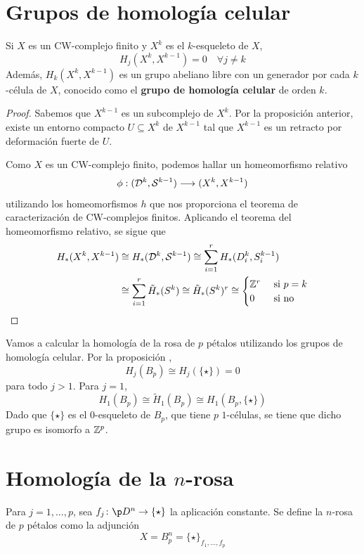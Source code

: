 \section{Grupos de homología celular}
\begin{corollary}\label{HomoCelular}
Si $X$ es un CW-complejo finito y $X^k$ es el $k$-esqueleto de $X$,
\[H_j(X^k,X^{k-1})=0 \quad \forall j \neq k\]
Además, $H_k(X^k,X^{k-1})$ es un grupo abeliano libre con un generador por
cada $k$-célula de $X$, conocido como el \textbf{grupo de homología celular}
de orden $k$.
\end{corollary}

\begin{proof}
Sabemos que $X^{k-1}$ es un subcomplejo de $X^k$. Por la proposición anterior,
existe un entorno compacto $U \subseteq X^k$ de $X^{k-1}$ tal que $X^{k-1}$
es un retracto por deformación fuerte de $U$.

Como $X$ es un CW-complejo finito, podemos hallar un homeomorfismo relativo
\[\phi: (\mathcal{D}^k, \mathcal{S}^{k-1}) \longrightarrow (X^k,X^{k-1})\]
utilizando los homeomorfismos $h$ que nos proporciona el teorema de
caracterización de CW-complejos finitos. Aplicando el teorema del
homeomorfismo relativo, se sigue que 
\begin{align*}
H_*(X^k,X^{k-1}) &\cong H_*(\mathcal{D}^k,\mathcal{S}^{k-1}) \cong 
	\sum^r_{i=1} H_*(D_i^k, S_i^{k-1}) \\
	& \cong \sum^r_{i=1} \tilde{H}_*(S^k) \cong
	\tilde{H}_*(S^k)^r \cong
	\begin{cases}
	\mathbb{Z}^r&\text{ si }p=k\\
	0&\text{ si no}
	\end{cases}
\end{align*}
\end{proof}

\begin{example}
Vamos a calcular la homología de la rosa de $p$ pétalos utilizando los grupos
de homología celular. Por la proposición ,
\[H_j(B_p)\cong H_j(\{\star\})=0\]
para todo $j > 1$. Para $j=1$,
\[H_1(B_p)\cong \tilde{H}_1(B_p)\cong H_1(B_p,\{\star\})\]
Dado que $\{\star\}$ es el $0$-esqueleto de $B_p$, que tiene $p$ $1$-células, se
tiene que dicho grupo es isomorfo a $\mathbb{Z}^p$.
\end{example}

\section{Homología de la $n$-rosa}
Para $j=1,\dots,p$, sea $f_j\colon \p D^n \to \{\star\}$ la aplicación
constante. Se define la $n$-rosa de $p$ pétalos como la adjunción
\[X=B^n_p=\{\star\}_{f_1,\dots,f_p}\]

